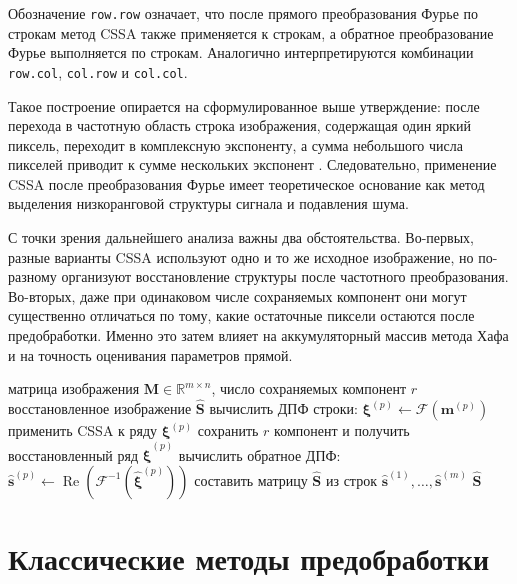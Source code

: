 Обозначение \texttt{row.row} означает, что после прямого преобразования Фурье по строкам метод CSSA также применяется к строкам, а обратное преобразование Фурье выполняется по строкам. Аналогично интерпретируются комбинации \texttt{row.col}, \texttt{col.row} и \texttt{col.col}.

Такое построение опирается на сформулированное выше утверждение: после перехода в частотную область строка изображения, содержащая один яркий пиксель, переходит в комплексную экспоненту, а сумма небольшого числа пикселей приводит к сумме нескольких экспонент \cite{trickett2003,zhornikova2016}. Следовательно, применение CSSA после преобразования Фурье имеет теоретическое основание как метод выделения низкоранговой структуры сигнала и подавления шума.

С точки зрения дальнейшего анализа важны два обстоятельства. Во-первых, разные варианты CSSA используют одно и то же исходное изображение, но по-разному организуют восстановление структуры после частотного преобразования. Во-вторых, даже при одинаковом числе сохраняемых компонент они могут существенно отличаться по тому, какие остаточные пиксели остаются после предобработки. Именно это затем влияет на аккумуляторный массив метода Хафа и на точность оценивания параметров прямой.

\begin{algorithm}[H]
	\caption{Алгоритм \texttt{CSSA ROW-ROW}}
	\begin{algorithmic}[1]
		\Require матрица изображения $\mathbf{M}\in\mathbb{R}^{m\times n}$, число сохраняемых компонент $r$
		\Ensure восстановленное изображение $\widehat{\mathbf{S}}$
			\State вычислить ДПФ строки: $\boldsymbol{\xi}^{(p)} \gets \mathcal{F}(\mathbf{m}^{(p)})$
			\State применить CSSA к ряду $\boldsymbol{\xi}^{(p)}$
			\State сохранить $r$ компонент и получить восстановленный ряд $\widehat{\boldsymbol{\xi}}^{(p)}$
			\State вычислить обратное ДПФ:
			$\widehat{\mathbf{s}}^{(p)} \gets \operatorname{Re}(\mathcal{F}^{-1}(\widehat{\boldsymbol{\xi}}^{(p)}))$
		\EndFor
		\State составить матрицу $\widehat{\mathbf{S}}$ из строк $\widehat{\mathbf{s}}^{(1)},\dots,\widehat{\mathbf{s}}^{(m)}$
		\State \Return $\widehat{\mathbf{S}}$
	\end{algorithmic}
\end{algorithm}

\section{Классические методы предобработки}

